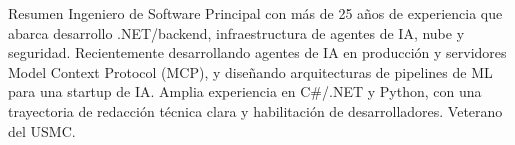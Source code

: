 \documentclass{resume} %
\begin{document}

\begin{rSection}{Resumen}
Ingeniero de Software Principal con m\'as de 25 a\~nos de experiencia que abarca desarrollo .NET/backend, infraestructura de agentes de IA, nube y seguridad. Recientemente desarrollando agentes de IA en producci\'on y servidores Model Context Protocol (MCP), y dise\~nando arquitecturas de pipelines de ML para una startup de IA. Amplia experiencia en C\#/.NET y Python, con una trayectoria de redacci\'on t\'ecnica clara y habilitaci\'on de desarrolladores. Veterano del USMC.
\end{rSection}


\end{document}
